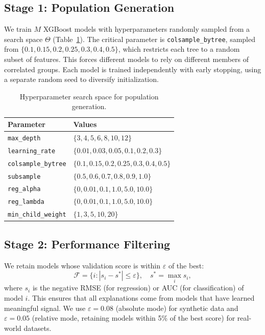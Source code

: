\documentclass[11pt]{article}
\begin{document}
\subsection{Stage 1: Population Generation}

We train $M$ XGBoost models with hyperparameters randomly sampled from a
search space $\Theta$ (Table~\ref{tab:search_space}). The critical
parameter is \texttt{colsample\_bytree}, sampled from
$\{0.1, 0.15, 0.2, 0.25, 0.3, 0.4, 0.5\}$, which restricts each tree
to a random subset of features. This forces different models to rely on
different members of correlated groups. Each model is trained independently
with early stopping, using a separate random seed to diversify initialization.

\begin{table}[h]
\centering
\caption{Hyperparameter search space for population generation.}
\label{tab:search_space}
\begin{tabular}{ll}
\toprule
\textbf{Parameter} & \textbf{Values} \\
\midrule
\texttt{max\_depth}         & $\{3, 4, 5, 6, 8, 10, 12\}$ \\
\texttt{learning\_rate}     & $\{0.01, 0.03, 0.05, 0.1, 0.2, 0.3\}$ \\
\texttt{colsample\_bytree}  & $\{0.1, 0.15, 0.2, 0.25, 0.3, 0.4, 0.5\}$ \\
\texttt{subsample}          & $\{0.5, 0.6, 0.7, 0.8, 0.9, 1.0\}$ \\
\texttt{reg\_alpha}         & $\{0, 0.01, 0.1, 1.0, 5.0, 10.0\}$ \\
\texttt{reg\_lambda}        & $\{0, 0.01, 0.1, 1.0, 5.0, 10.0\}$ \\
\texttt{min\_child\_weight} & $\{1, 3, 5, 10, 20\}$ \\
\bottomrule
\end{tabular}
\end{table}

\subsection{Stage 2: Performance Filtering}

We retain models whose validation score is within $\varepsilon$ of the
best:
\begin{equation}
  \mathcal{F} = \{i : |s_i - s^*| \leq \varepsilon\},
  \quad s^* = \max_i s_i,
  \label{eq:filter}
\end{equation}
where $s_i$ is the negative RMSE (for regression) or AUC (for
classification) of model $i$. This ensures that all explanations come from
models that have learned meaningful signal. We use $\varepsilon = 0.08$
(absolute mode) for synthetic data and $\varepsilon = 0.05$ (relative
mode, retaining models within 5\% of the best score) for real-world
datasets.
\end{document}
